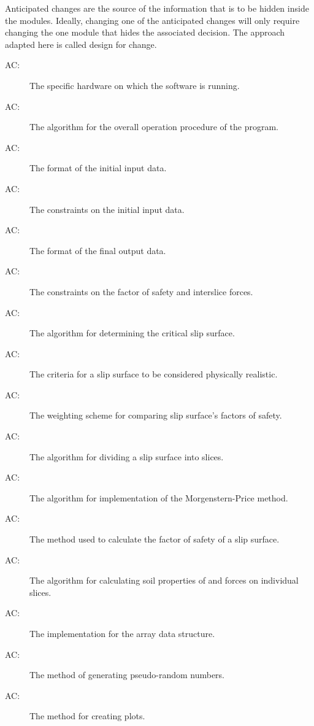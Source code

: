 \documentclass[12pt, titlepage]{article}
\newcounter{acnum}
\begin{document}
\hspace{3ex}Anticipated changes are the source of the information that
is to be hidden inside the modules. Ideally, changing one of the
anticipated changes will only require changing the one module that
hides the associated decision. The approach adapted here is called
design for change.

\begin{description}
\item[AC\theacnum \label{AC_hardware}:] The
  specific hardware on which the software is running.
\item[AC\theacnum \label{AC_Control}:] The
  algorithm for the overall operation procedure of the program.
\item[AC\theacnum \label{AC_input}:] The format
  of the initial input data.
\item[AC\theacnum \label{AC_inputConstraints}:] The       
constraints on the initial input data.
\item[AC\theacnum \label{AC_output}:] The format
  of the final output data.
\item[AC\theacnum \label{AC_outputConstraints}:] The     
constraints on the factor of safety and interslice forces.
\item[AC\theacnum \label{AC_GenAlg}:] The algorithm
  for determining the critical slip surface.
\item[AC\theacnum \label{AC_Kin}:] The criteria for
  a slip surface to be considered physically realistic.
\item[AC\theacnum \label{AC_FSweight}:] The
  weighting scheme for comparing slip surface's factors of safety.
\item[AC\theacnum \label{AC_Slicer}:] The
  algorithm for dividing a slip surface into slices.
\item[AC\theacnum \label{AC_MP}:] The
  algorithm for implementation of the Morgenstern-Price method.
\item[AC\theacnum \label{AC_CalcFS}:] The method used to 
  calculate the factor of safety of a slip surface.
\item[AC\theacnum \label{AC_PropSorter}:] The
  algorithm for calculating soil properties of and forces on individual slices.
\item[AC\theacnum \label{AC_Array}:] The
  implementation for the array data structure.
\item[AC\theacnum \label{AC_Rand}:] The method
  of generating pseudo-random numbers.
\item[AC\theacnum \label{AC_Plot}:] The method
  for creating plots.
\end{description}
\end{document}
